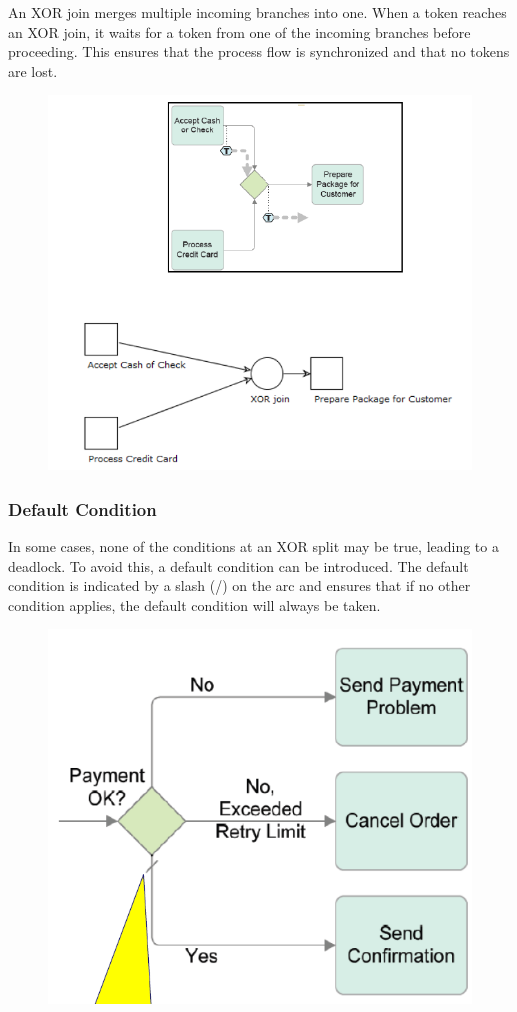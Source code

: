 An XOR join merges multiple incoming branches into one. When a token reaches an XOR join, it waits for a token from one of the incoming branches before proceeding. This ensures that the process flow is synchronized and that no tokens are lost.
\begin{figure}[h!]
    \centering
    \includegraphics[width=0.75\linewidth]{capitolo 9/4.png}
\end{figure}
\newpage

\subsubsection{Default Condition}

In some cases, none of the conditions at an XOR split may be true, leading to a deadlock. To avoid this, a default condition can be introduced. The default condition is indicated by a slash (/) on the arc and ensures that if no other condition applies, the default condition will always be taken.
\begin{figure}[h!]
    \centering
    \includegraphics[width=0.5\linewidth]{capitolo 9/5.png}
\end{figure}

